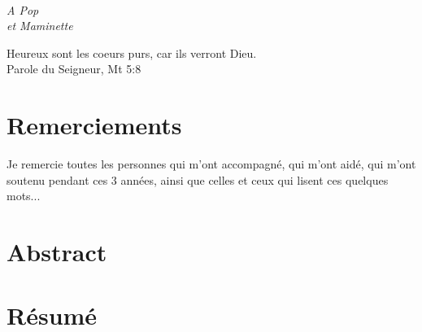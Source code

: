 \documentclass[a4paper]{book}
\begin{document}

\cleardoublepage\normalsize
\ 
\vfill
\begin{FlushRight}\itshape
A Pop\\
et Maminette

\vfill\normalshape
Heureux sont les coeurs purs, car ils verront Dieu.\\[3pt]
{\small Parole du Seigneur, Mt 5:8}


\end{FlushRight}

\newpage
\pagestyle{plain}

\chapter*{Remerciements}

Je remercie toutes les personnes qui m'ont accompagné, qui m'ont aidé, qui m'ont soutenu pendant ces 3 années, ainsi que celles et ceux qui lisent ces quelques mots...


\newpage

\chapter*{Abstract}
  \vspace*{0.5cm}
\begin{mdframed}[linecolor=white]
  \begin{mdframed}[linecolor=white]
  \abstractEN 
\end{mdframed} 
\end{mdframed}






\chapter*{Résumé}
\vspace*{0.5cm}
\begin{mdframed}[linecolor=white]
  \begin{mdframed}[linecolor=white]
\abstractFR
\end{mdframed} 
\end{mdframed}
\end{document}
